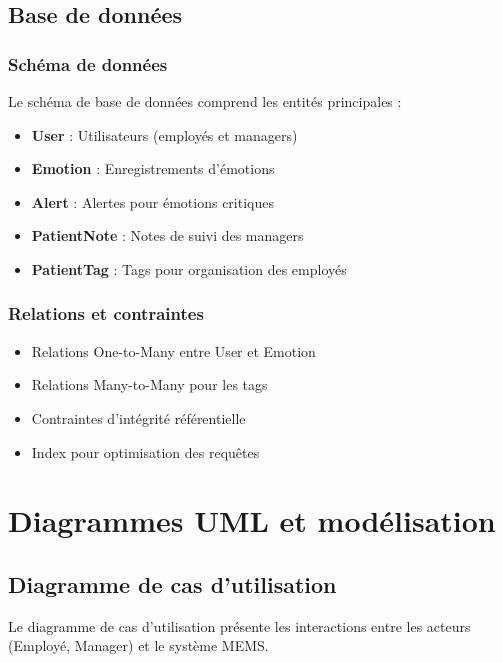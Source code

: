 \documentclass[a4paper,11pt]{report}
\begin{document}
\section{Base de données}

\subsection{Schéma de données}

Le schéma de base de données comprend les entités principales :

\begin{itemize}
    \item \textbf{User} : Utilisateurs (employés et managers)
    \item \textbf{Emotion} : Enregistrements d'émotions
    \item \textbf{Alert} : Alertes pour émotions critiques
    \item \textbf{PatientNote} : Notes de suivi des managers
    \item \textbf{PatientTag} : Tags pour organisation des employés
\end{itemize}

\subsection{Relations et contraintes}

\begin{itemize}
    \item Relations One-to-Many entre User et Emotion
    \item Relations Many-to-Many pour les tags
    \item Contraintes d'intégrité référentielle
    \item Index pour optimisation des requêtes
\end{itemize}

\chapter{Diagrammes UML et modélisation}

\section{Diagramme de cas d'utilisation}

Le diagramme de cas d'utilisation présente les interactions entre les acteurs (Employé, Manager) et le système MEMS.
\end{document}
